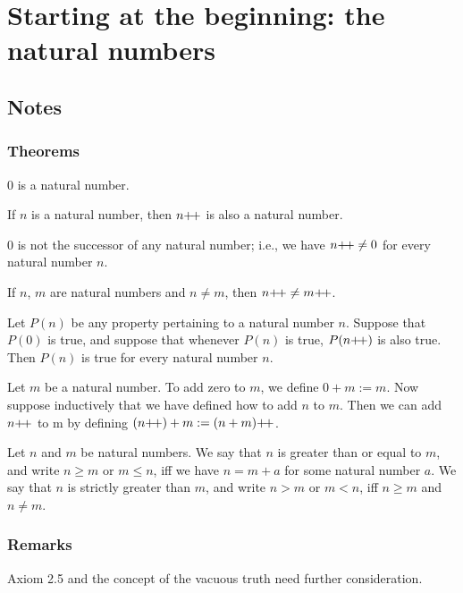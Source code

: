 \section{Starting at the beginning: the natural numbers}
\subsection{Notes}
\subsubsection{Theorems}
\begin{axiom}
    $0$ is a natural number.
\end{axiom}
\begin{axiom}
    If $n$ is a natural number, then $n{+}{\mkern-3mu}{+}$ is also a natural number.
\end{axiom}
\begin{axiom}
    $0$ is not the successor of any natural number; i.e., we have $n{+}{\mkern-3mu}{+} \neq 0$ for every natural number $n$.
\end{axiom}
\begin{axiom}
    If $n$, $m$ are natural numbers and $n \neq m$, then $n{+}{\mkern-3mu}{+} \neq m{+}{\mkern-3mu}{+}$.
\end{axiom}
\begin{axiom}
    Let $P(n)$ be any property pertaining to a natural number $n$. Suppose that $P(0)$ is true, and suppose that whenever $P(n)$ is true, $P(n{+}{\mkern-3mu}{+})$ is also true. Then $P(n)$ is true for every natural number $n$.
\end{axiom}
\begin{definition}
    Let $m$ be a natural number. To add zero to $m$, we define $0 + m := m$. Now suppose inductively that we have defined how to add $n$ to $m$. Then we can add $n{+}{\mkern-3mu}{+}$ to m by defining $(n{+}{\mkern-3mu}{+}) + m := (n + m){+}{\mkern-3mu}{+}$.
\end{definition}
\begin{definition}
    Let $n$ and $m$ be natural numbers. We say that $n$ is greater than or equal to $m$, and write $n \geq m$ or $m \leq n$, iff we have $n = m + a$ for some natural number $a$. We say that $n$ is strictly greater than $m$, and write $n > m$ or $m < n$, iff $n \geq m$ and $n \neq m$.
\end{definition}
\subsubsection{Remarks}
Axiom 2.5 and the concept of the vacuous truth need further consideration.

